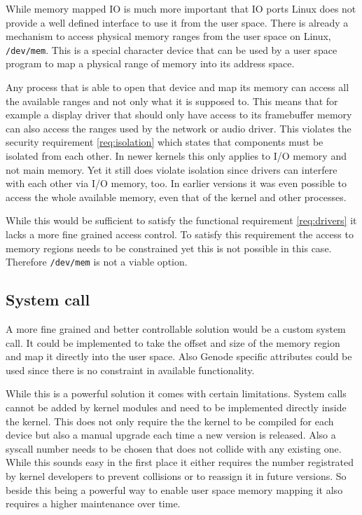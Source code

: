 \documentclass[
a4paper,
12pt,
notitlepage,
parskip=half,
DIV=11,
]{scrbook}
\begin{document}
		While memory mapped IO is much more important that IO ports Linux does not provide a well defined interface to use it from the user space.
		There is already a mechanism to access physical memory ranges from the user space on Linux, \texttt{/dev/mem}.
		This is a special character device that can be used by a user space program to map a physical range of memory into its address space. \citep{devmem}
		
		Any process that is able to open that device and map its memory can access all the available ranges and not only what it is supposed to.
		This means that for example a display driver that should only have access to its framebuffer memory can also access the ranges used by the network or audio driver.
		This violates the security requirement \ref{req:isolation} which states that components must be isolated from each other.
		In newer kernels this only applies to I/O memory and not main memory.
		Yet it still does violate isolation since drivers can interfere with each other via I/O memory, too.
		In earlier versions it was even possible to access the whole available memory, even that of the kernel and other processes. \citep{devmem}
		
		While this would be sufficient to satisfy the functional requirement \ref{req:drivers} it lacks a more fine grained access control.
		To satisfy this requirement the access to memory regions needs to be constrained yet this is not possible in this case.
		Therefore \texttt{/dev/mem} is not a viable option.
		
		\subsection{System call}
		
		A more fine grained and better controllable solution would be a custom system call.
		It could be implemented to take the offset and size of the memory region and map it directly into the user space.
		Also Genode specific attributes could be used since there is no constraint in available functionality.
		
		While this is a powerful solution it comes with certain limitations.
		System calls cannot be added by kernel modules and need to be implemented directly inside the kernel.
		This does not only require the the kernel to be compiled for each device but also a manual upgrade each time a new version is released.
		Also a syscall number needs to be chosen that does not collide with any existing one.
		While this sounds easy in the first place it either requires the number registrated by kernel developers to prevent collisions or to reassign it in future versions.
		So beside this being a powerful way to enable user space memory mapping it also requires a higher maintenance over time. \citep{syscall}
		
\end{document}
